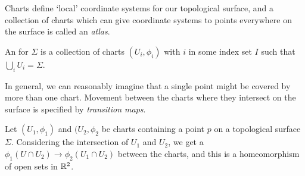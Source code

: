 \documentclass[a4paper]{article}
\begin{document}
Charts define `local' coordinate systems for our topological surface, and a collection of charts which can give coordinate systems to points everywhere on the surface is called an \emph{atlas}.

\begin{definition}[Atlas]
    An  for $\Sigma$ is a collection of charts $(U_i, \phi_i)$ with $i$ in some index set $I$ such that $\bigcup_{i} U_i = \Sigma$.
\end{definition}

In general, we can reasonably imagine that a single point might be covered by more than one chart. Movement between the charts where they intersect on the surface is specified by \emph{transition maps}.

\begin{definition}
    Let $(U_1, \phi_1)$ and $(U_2, \phi_2$ be charts containing a point $p$ on a topological surface $\Sigma$.
    Considering the intersection of $U_1$ and $U_2$, we get a  $\phi_1(U \cap U_2) \rightarrow \phi_2(U_1 \cap U_2)$ between the charts, and this is a homeomorphism of open sets in $\mathbb{R}^2$.
\end{definition}
\end{document}
